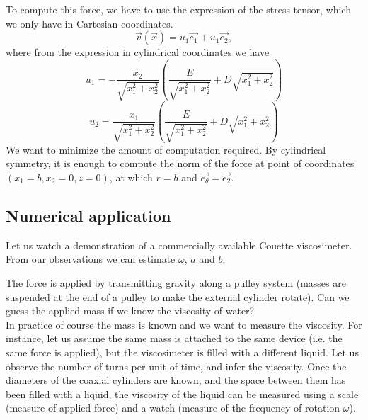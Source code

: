 \documentclass[DIV=12]{article}
\newcommand{\etheta}{\vec{e_\theta}}
\begin{document}
To compute this force, we have to use the expression 
 of the stress tensor, which we only have in Cartesian coordinates.\\
 \begin{equation}
\vec{v}(\vec{x}) = u_1 \vec{e_1} + u_1 \vec{e_2},
\end{equation}
where from the expression in cylindrical coordinates we have
 \begin{equation}
u_1 =  -\frac{x_2}{\sqrt{x_1^2+x_2^2}}\left(\frac{E}{\sqrt{x_1^2+x_2^2}} +  D \sqrt{x_1^2+x_2^2}\right)
\end{equation}
\begin{equation}
u_2 =  \frac{x_1}{\sqrt{x_1^2+x_2^2}}\left(\frac{E}{\sqrt{x_1^2+x_2^2}} +  D \sqrt{x_1^2+x_2^2}\right)
\end{equation}
 We want to minimize the amount of computation required.
 By cylindrical 
 symmetry, it is enough to compute the norm of the force at point of coordinates 
  $(x_1 = b, x_2 = 0, z = 0)$, at which $r=b$ and $\etheta = \vec{e_2}$.\\


\subsection{Numerical application}
 Let us watch a demonstration of a commercially available Couette 
 viscosimeter. From our observations we can estimate $\omega$, $a$ and $b$.

 The force is applied by transmitting gravity along a pulley system (masses are suspended
 at the end of a pulley to make the external cylinder rotate). 
 Can we guess the applied mass if we know the viscosity of water?\\



 In practice of course the mass is known and we want to measure the viscosity.
 For instance, let us assume the same mass is attached to the same device (i.e. the same force
 is applied), but the viscosimeter is filled with a different liquid. Let us observe the number of turns
 per unit of time, and infer the viscosity. Once the diameters of the coaxial cylinders are known,
 and the space between them has been filled with a liquid, the viscosity 
 of the liquid can be measured using a scale (measure of applied force) and a watch (measure of
 the frequency of rotation $\omega$).
\end{document}
